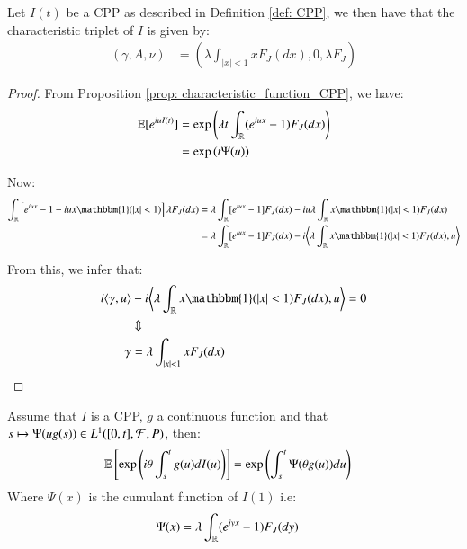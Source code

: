 \newpage 

\begin{proposition}
Let $I(t)$ be a CPP as described in Definition \ref{def: CPP}, we then have that the characteristic triplet of $I$ is given by:
\begin{align*}
(\gamma, A, \nu) &= 
\left(
\lambda \int_{|x|<1}xF_{J}(dx), 0, \lambda F_{J}
\right)
\end{align*}
\end{proposition}

\begin{proof}

From Proposition \ref{prop: characteristic_function_CPP}, we have: 
\begin{align*}
\mathbb{E}[e^{iuI(t)}] &= \exp\left(
\lambda t \int_{\mathbb{R}}(e^{iux}-1)F_{J}(dx)
\right) \\ 
&= 
\exp\left(t\Psi(u)\right)
\end{align*}

Now: 
\begin{align*}
\int_{\R}\left[
e^{iux}-1-iux\mathbbm{1}(|x|<1)
\right]\lambda F_{J}(dx) 
&= 
\lambda \int_{\R}[e^{iux}-1]F_{J}(dx) - iu\lambda\int_{\R}x\mathbbm{1}(|x|<1)F_{J}(dx) \\ 
&= 
\lambda \int_{\R}[e^{iux}-1]F_{J}(dx) - i \bigg{\langle} \lambda\int_{\R}x\mathbbm{1}(|x|<1)F_{J}(dx), u \bigg{\rangle}
\end{align*}

From this, we infer that: 
\begin{align*}
i\langle \gamma, u \rangle &- i\bigg{\langle} \lambda \int_{\R}x\mathbbm{1}(|x|<1)F_{J}(dx), u \bigg{\rangle}
= 0 \\ 
&\Updownarrow \\ 
\gamma &= \lambda \int_{|x|<1}xF_{J}(dx)
\end{align*}

\end{proof}

\begin{proposition}
\label{prop: Integral_g(s)dI(s)}
Assume that $I$ is a CPP, $g$ a continuous function and that 
$s\mapsto \Psi(ug(s)) \in L^{1}([0,t], \mathcal{F}, P)$, then: 
\begin{align*}
\mathbb{E}\left[
\exp\left(
i\theta\int_{s}^{t}g(u)dI(u)
\right)
\right] 
&= 
\exp\left(
\int_{s}^{t}\Psi(\theta g(u))du
\right)
\end{align*}
Where $\Psi(x)$ is the cumulant function of $I(1)$ i.e: 
\begin{align*}
\Psi(x) &= 
\lambda \int_{\mathbb{R}}(e^{iyx}-1)F_{J}(dy)
\end{align*}
\end{proposition}

